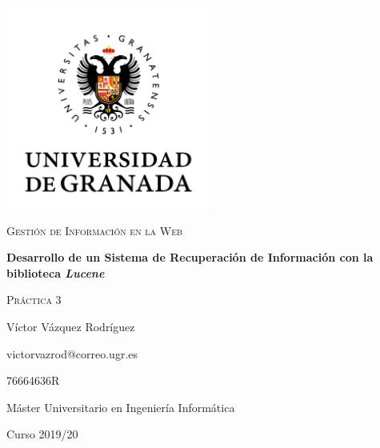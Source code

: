 \documentclass{article}
\begin{document}
\begin{titlepage}
  \centering
  \includegraphics[width=0.5\textwidth]{images/logo-ugr.png}\par
  \vspace{1cm}
  {\Large\scshape Gestión de Información en la Web \par}
  {\huge\bfseries Desarrollo de un Sistema de Recuperación de Información con la
  biblioteca \textit{Lucene} \par}
  \vspace{0.2cm}
  {\scshape Práctica 3 \par}
  \vfill
  {\large Víctor Vázquez Rodríguez  \par}
  {victorvazrod@correo.ugr.es \par}
  {76664636R}
  \vfill
  {\large Máster Universitario en Ingeniería Informática \par}
  \vspace{0.2cm}
  {Curso 2019/20 \par}
\end{titlepage}

\tableofcontents\newpage

\newpage
\newpage
\newpage
\newpage
\end{document}
